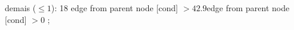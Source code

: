{{{%
demais ($\leq 1$): 18} edge from parent node [cond] {$>42.9$}}edge from parent node [cond] {$>0$}}
;